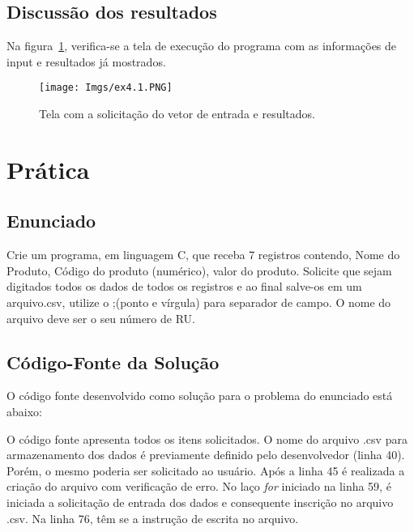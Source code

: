 \documentclass[
	12pt,				%
	openright,			%
	oneside,			%
	a4paper,			%
	chapter=TITLE,		%
	section=TITLE,		%
	english,			%
	french,				%
	spanish,			%
	brazil				%
	]{abntex2}
\begin{document}
\section[DISCUSSÃO DOS RESULTADOS]{Discussão dos resultados}
	
	Na figura~\ref{fig:ex4.1}, verifica-se a tela de execução do programa com as informações de input e resultados já mostrados.

	\begin{figure}[htp]
		\begin{center}
			\caption{Tela com a solicitação do vetor de entrada e resultados.} 
			\texttt{[image: Imgs/ex4.1.PNG]}
			\label{fig:ex4.1}
		\end{center}
	\end{figure}

\chapter[\bfseries{PRÁTICA 5}]{\bfseries{Prática}}

\section[ENUNCIADO]{Enunciado}
		
	Crie um programa, em linguagem C, que receba 7 registros contendo, Nome do Produto, Código do produto (numérico), valor do produto. Solicite que sejam digitados todos os dados de todos os registros e ao final salve-os em um arquivo.csv, utilize o ;(ponto e vírgula) para separador de campo. O nome do arquivo deve ser o seu número de RU.

\section[CÓDIGO-FONTE DA SOLUÇÃO]{Código-Fonte da Solução}

	O código fonte desenvolvido como solução para o problema do enunciado está abaixo:

		
	
	O código fonte apresenta todos os itens solicitados. O nome do arquivo .csv para armazenamento dos dados é previamente definido pelo desenvolvedor (linha 40). Porém, o mesmo poderia ser solicitado ao usuário. Após a linha 45 é realizada a criação do arquivo com verificação de erro. No laço \emph{for} iniciado na linha 59, é iniciada a solicitação de entrada dos dados e consequente inscrição no arquivo .csv. Na linha 76, têm se a instrução de escrita no arquivo. 
\end{document}
